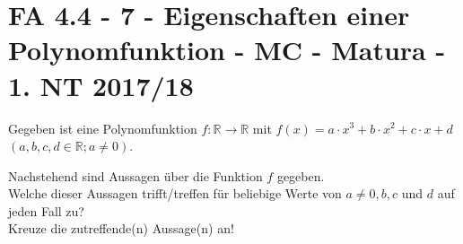 \section{FA 4.4 - 7 - Eigenschaften einer Polynomfunktion - MC - Matura - 1. NT 2017/18}

\begin{beispiel}[FA 4.4]{1}
Gegeben ist eine Polynomfunktion $f\!:\mathbb{R}\rightarrow\mathbb{R}$ mit $f(x)=a\cdot x^3+b\cdot x^2+c\cdot x+d$ $(a, b, c, d\in\mathbb{R}; a\neq 0)$.

Nachstehend sind Aussagen über die Funktion $f$ gegeben.\\
Welche dieser Aussagen trifft/treffen für beliebige Werte von $a\neq 0, b, c$ und $d$ auf jeden Fall zu?\\
Kreuze die zutreffende(n) Aussage(n) an!

\end{beispiel}